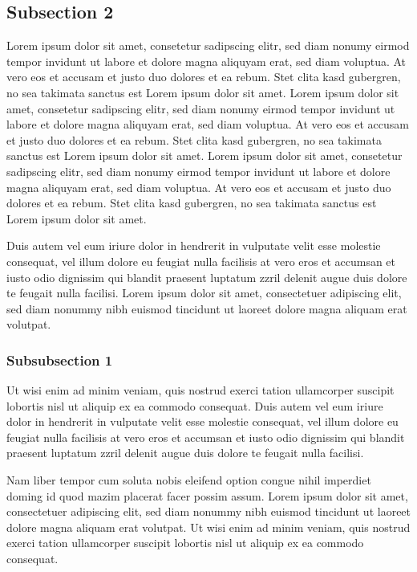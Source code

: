 \subsection{Subsection 2}
Lorem ipsum dolor sit amet, consetetur sadipscing elitr, sed diam nonumy eirmod tempor invidunt ut labore et dolore magna aliquyam erat, sed diam voluptua. At vero eos et accusam et justo duo dolores et ea rebum. Stet clita kasd gubergren, no sea takimata sanctus est Lorem ipsum dolor sit amet. Lorem ipsum dolor sit amet, consetetur sadipscing elitr, sed diam nonumy eirmod tempor invidunt ut labore et dolore magna aliquyam erat, sed diam voluptua. At vero eos et accusam et justo duo dolores et ea rebum. Stet clita kasd gubergren, no sea takimata sanctus est Lorem ipsum dolor sit amet. Lorem ipsum dolor sit amet, consetetur sadipscing elitr, sed diam nonumy eirmod tempor invidunt ut labore et dolore magna aliquyam erat, sed diam voluptua. At vero eos et accusam et justo duo dolores et ea rebum. Stet clita kasd gubergren, no sea takimata sanctus est Lorem ipsum dolor sit amet.

Duis autem vel eum iriure dolor in hendrerit in vulputate velit esse molestie consequat, vel illum dolore eu feugiat nulla facilisis at vero eros et accumsan et iusto odio dignissim qui blandit praesent luptatum zzril delenit augue duis dolore te feugait nulla facilisi. Lorem ipsum dolor sit amet, consectetuer adipiscing elit, sed diam nonummy nibh euismod tincidunt ut laoreet dolore magna aliquam erat volutpat.
\subsubsection{Subsubsection 1}
Ut wisi enim ad minim veniam, quis nostrud exerci tation ullamcorper suscipit lobortis nisl ut aliquip ex ea commodo consequat. Duis autem vel eum iriure dolor in hendrerit in vulputate velit esse molestie consequat, vel illum dolore eu feugiat nulla facilisis at vero eros et accumsan et iusto odio dignissim qui blandit praesent luptatum zzril delenit augue duis dolore te feugait nulla facilisi.

Nam liber tempor cum soluta nobis eleifend option congue nihil imperdiet doming id quod mazim placerat facer possim assum. Lorem ipsum dolor sit amet, consectetuer adipiscing elit, sed diam nonummy nibh euismod tincidunt ut laoreet dolore magna aliquam erat volutpat. Ut wisi enim ad minim veniam, quis nostrud exerci tation ullamcorper suscipit lobortis nisl ut aliquip ex ea commodo consequat.

